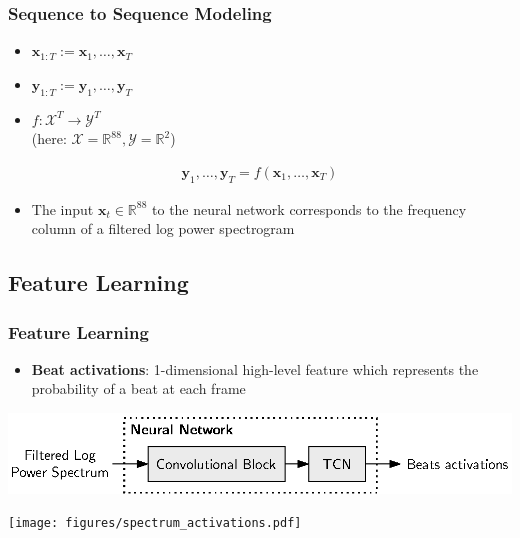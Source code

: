 \documentclass{beamer}
\begin{document}
\begin{frame}
\frametitle{Sequence to Sequence Modeling}
\begin{itemize}
\item {}  $\mathbf x_{1:T} := \mathbf x_1, \dots, \mathbf x_T$ 
\vspace{0.5em}
\item {} $\mathbf y_{1:T} := \mathbf y_1, \dots, \mathbf y_T$ 
\vspace{0.5em}
\item {} $f: \mathcal X^T \rightarrow \mathcal Y^T$ \\\vspace{0.5em}(here: $\mathcal X = \mathbb R^{88}, \mathcal Y = \mathbb R^2$)
\end{itemize}
\begin{align}
\mathbf y_1, \dots, \mathbf y_T  = f(\mathbf x_1, \dots, \mathbf x_T)
\end{align}
\begin{itemize}
\item The input  $\mathbf x_t \in \mathbb R^{88}$ to the neural network corresponds to the frequency column of a filtered log power spectrogram
\end{itemize}
\end{frame}





\subsection{Feature Learning}

\begin{frame}
\frametitle{Feature Learning}
\begin{itemize}
\item \textbf{Beat activations}: 1-dimensional high-level feature which represents the probability of a beat at each frame 
\end{itemize}

\begin{minipage}{\textwidth} 
\centering
\includegraphics[scale=0.8]{figures/neural_net.eps}
\end{minipage}
\vspace{2em}

\begin{minipage}{\textwidth} 
\centering
\texttt{[image: figures/spectrum\_activations.pdf]}
\end{minipage}
 
\end{frame}
\end{document}
